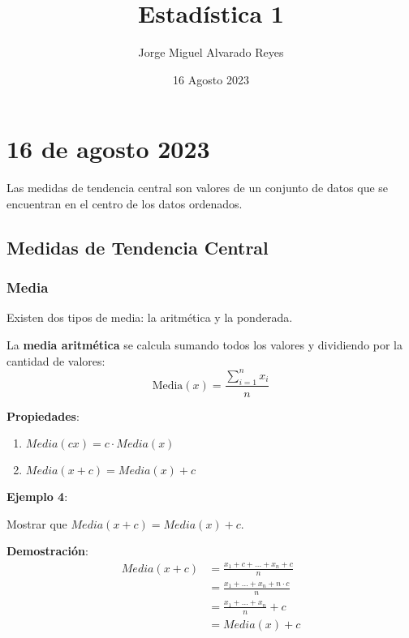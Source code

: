 \documentclass{article}
\title{Estadística 1}
\author{Jorge Miguel Alvarado Reyes}
\date{16 Agosto 2023}
\begin{document}
\maketitle

\newpage

\tableofcontents

\newpage

\section{16 de agosto 2023} %

Las medidas de tendencia central son valores de un conjunto de datos que se encuentran en el centro de los datos ordenados.

\subsection{Medidas de Tendencia Central} %

\subsubsection{Media}

\noindent Existen dos tipos de media: la aritmética y la ponderada.

\noindent La \textbf{media aritmética} se calcula sumando todos los valores y dividiendo por la cantidad de valores:
\[
    \text{Media}(x) = \frac{\sum_{i=1}^{n} x_i}{n}
\]

\textbf{Propiedades}:
\begin{enumerate}
    \item $Media(cx) = c \cdot Media(x)$
    \item $Media(x+c) = Media(x) + c$
\end{enumerate}

\textbf{Ejemplo 4}:

Mostrar que $Media(x+c) = Media(x) + c$.

\textbf{Demostración}:
\[
    \begin{aligned}
        Media(x+c) & = \frac{x_1+c + \ldots + x_n+c}{n}         \\
                   & = \frac{x_1 + \ldots + x_n + n \cdot c}{n} \\
                   & = \frac{x_1 + \ldots + x_n}{n} + c         \\
                   & = Media(x) + c
    \end{aligned}
\]
\end{document}
